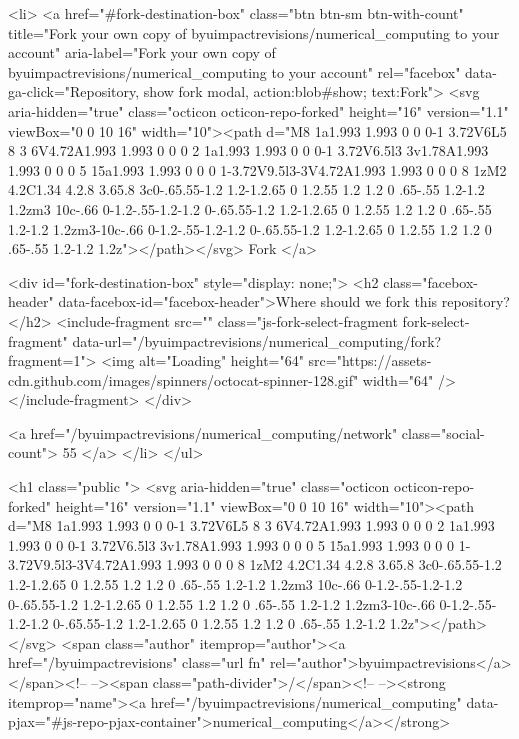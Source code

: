   <li>
          <a href="#fork-destination-box" class="btn btn-sm btn-with-count"
              title="Fork your own copy of byuimpactrevisions/numerical_computing to your account"
              aria-label="Fork your own copy of byuimpactrevisions/numerical_computing to your account"
              rel="facebox"
              data-ga-click="Repository, show fork modal, action:blob#show; text:Fork">
              <svg aria-hidden="true" class="octicon octicon-repo-forked" height="16" version="1.1" viewBox="0 0 10 16" width="10"><path d="M8 1a1.993 1.993 0 0 0-1 3.72V6L5 8 3 6V4.72A1.993 1.993 0 0 0 2 1a1.993 1.993 0 0 0-1 3.72V6.5l3 3v1.78A1.993 1.993 0 0 0 5 15a1.993 1.993 0 0 0 1-3.72V9.5l3-3V4.72A1.993 1.993 0 0 0 8 1zM2 4.2C1.34 4.2.8 3.65.8 3c0-.65.55-1.2 1.2-1.2.65 0 1.2.55 1.2 1.2 0 .65-.55 1.2-1.2 1.2zm3 10c-.66 0-1.2-.55-1.2-1.2 0-.65.55-1.2 1.2-1.2.65 0 1.2.55 1.2 1.2 0 .65-.55 1.2-1.2 1.2zm3-10c-.66 0-1.2-.55-1.2-1.2 0-.65.55-1.2 1.2-1.2.65 0 1.2.55 1.2 1.2 0 .65-.55 1.2-1.2 1.2z"></path></svg>
            Fork
          </a>

          <div id="fork-destination-box" style="display: none;">
            <h2 class="facebox-header" data-facebox-id="facebox-header">Where should we fork this repository?</h2>
            <include-fragment src=""
                class="js-fork-select-fragment fork-select-fragment"
                data-url="/byuimpactrevisions/numerical_computing/fork?fragment=1">
              <img alt="Loading" height="64" src="https://assets-cdn.github.com/images/spinners/octocat-spinner-128.gif" width="64" />
            </include-fragment>
          </div>

    <a href="/byuimpactrevisions/numerical_computing/network" class="social-count">
      55
    </a>
  </li>
</ul>

    <h1 class="public ">
  <svg aria-hidden="true" class="octicon octicon-repo-forked" height="16" version="1.1" viewBox="0 0 10 16" width="10"><path d="M8 1a1.993 1.993 0 0 0-1 3.72V6L5 8 3 6V4.72A1.993 1.993 0 0 0 2 1a1.993 1.993 0 0 0-1 3.72V6.5l3 3v1.78A1.993 1.993 0 0 0 5 15a1.993 1.993 0 0 0 1-3.72V9.5l3-3V4.72A1.993 1.993 0 0 0 8 1zM2 4.2C1.34 4.2.8 3.65.8 3c0-.65.55-1.2 1.2-1.2.65 0 1.2.55 1.2 1.2 0 .65-.55 1.2-1.2 1.2zm3 10c-.66 0-1.2-.55-1.2-1.2 0-.65.55-1.2 1.2-1.2.65 0 1.2.55 1.2 1.2 0 .65-.55 1.2-1.2 1.2zm3-10c-.66 0-1.2-.55-1.2-1.2 0-.65.55-1.2 1.2-1.2.65 0 1.2.55 1.2 1.2 0 .65-.55 1.2-1.2 1.2z"></path></svg>
  <span class="author" itemprop="author"><a href="/byuimpactrevisions" class="url fn" rel="author">byuimpactrevisions</a></span><!--
--><span class="path-divider">/</span><!--
--><strong itemprop="name"><a href="/byuimpactrevisions/numerical_computing" data-pjax="#js-repo-pjax-container">numerical_computing</a></strong>

